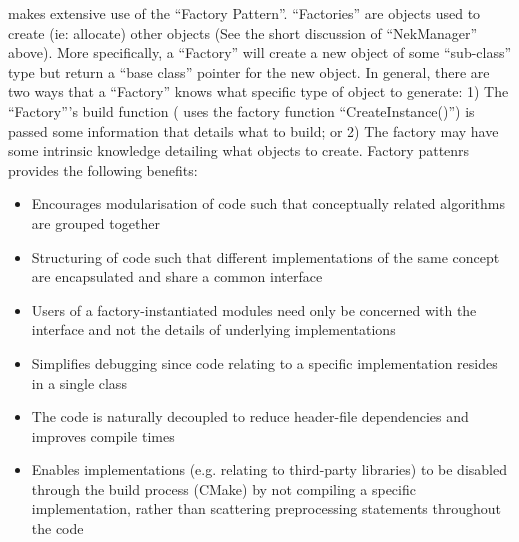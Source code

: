 {\nek} makes extensive use of the ``Factory Pattern''.
``Factories'' are objects used to create (ie: allocate) other objects
(See the short discussion of ``NekManager'' above).  More
specifically, a ``Factory'' will create a new object of some
``sub-class'' type but return a ``base class'' pointer for the new
object. In general, there are two ways that a ``Factory'' knows what
specific type of object to generate: 1) The ``Factory'''s build
function ({\nek} uses the factory function ``CreateInstance()'') is
passed some information that details what to build; or 2) The factory may
have some intrinsic knowledge detailing what objects to create. 
Factory pattenrs provides the following benefits:
\begin{itemize}
\item Encourages modularisation of code such that conceptually related
algorithms are grouped together
\item Structuring of code such that different implementations of the same
concept are encapsulated and share a common interface
\item Users of a factory-instantiated modules need only be concerned with the
 interface and not the details of underlying implementations
\item Simplifies debugging since code relating to a specific implementation
 resides in a single class
\item The code is naturally decoupled to reduce header-file dependencies and
 improves compile times
\item Enables implementations (e.g. relating to third-party libraries) to be
 disabled through the build process (CMake) by not compiling a specific 
 implementation, rather than scattering preprocessing statements throughout the
 code
\end{itemize}






